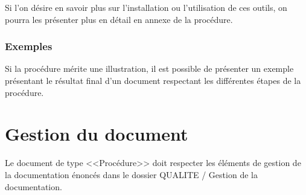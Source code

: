\documentclass{mise_en_page}
\begin{document}
Si l’on désire en savoir plus sur l’installation ou l’utilisation de ces
outils, on pourra les présenter plus en détail en annexe de la
procédure.

\subsubsection[Exemples]{Exemples}
Si la procédure mérite une illustration, il est possible de présenter un
exemple présentant le résultat final d’un document respectant les
différentes étapes de la procédure.

\section[Gestion du document]{Gestion du document}



Le document de type
{\textless}{\textless}Procédure{\textgreater}{\textgreater} doit
respecter les éléments de gestion de la documentation énoncés dans le
dossier QUALITE / Gestion de la documentation.
\end{document}
